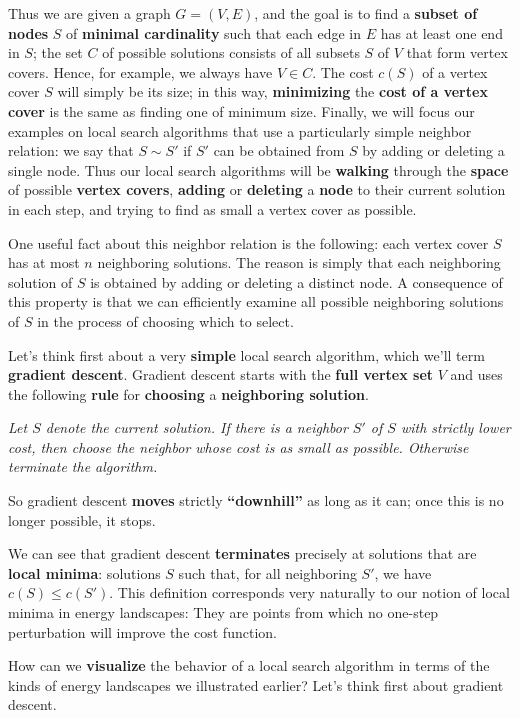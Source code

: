 Thus we are given a graph $G = (V, E)$, and the goal is to find a \textbf{subset of nodes} $S$ of \textbf{minimal cardinality} such that each edge in $E$ has at least one end in $S$; the set $C$ of possible solutions consists of all subsets $S$ of $V$ that form vertex covers. Hence, for example, we always have $V \in C$. The cost $c(S)$ of a vertex cover $S$ will simply be its size; in this way, \textbf{minimizing} the \textbf{cost of a vertex cover} is the same as finding one of minimum size. Finally, we will focus our examples on local search algorithms that use a particularly simple neighbor relation: we say that $S \sim S'$ if $S'$ can be obtained from $S$ by adding or deleting a single node. Thus our local search algorithms will be \textbf{walking} through the \textbf{space} of possible \textbf{vertex covers}, \textbf{adding} or \textbf{deleting} a \textbf{node} to their current solution in each step, and trying to find as small a vertex cover as possible. 

One useful fact about this neighbor relation is the following: each vertex cover $S$ has at most $n$ neighboring solutions. The reason is simply that each neighboring solution of $S$ is obtained by adding or deleting a distinct node. A consequence of this property is that we can efficiently examine all possible neighboring solutions of $S$ in the process of choosing which to select.

Let’s think first about a very \textbf{simple} local search algorithm, which we’ll term \textbf{gradient descent}. Gradient descent starts with the \textbf{full vertex set} $V$ and uses the following \textbf{rule} for \textbf{choosing} a \textbf{neighboring solution}.

\textit{Let $S$ denote the current solution. If there is a neighbor $S'$ of $S$ with strictly lower cost, then choose the neighbor whose cost is as small as possible. Otherwise terminate the algorithm.}

So gradient descent \textbf{moves} strictly \textbf{“downhill”} as long as it can; once this is no longer possible, it stops. 

We can see that gradient descent \textbf{terminates} precisely at solutions that are \textbf{local minima}: solutions $S$ such that, for all neighboring $S'$, we have $c(S) \leq c(S')$. This definition corresponds very naturally to our notion of local minima in energy landscapes: They are points from which no one-step perturbation will improve the cost function. 

How can we \textbf{visualize} the behavior of a local search algorithm in terms of the kinds of energy landscapes we illustrated earlier? Let’s think first about gradient descent. 

